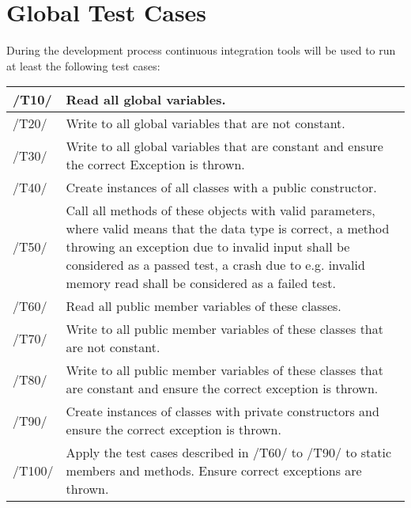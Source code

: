 \chapter{Global Test Cases}
During the development process continuous integration tools will be used to run at least the following test cases: \\

\begin{longtable}{|p{1cm} | p{15cm}|}
  \hline
  /T10/ & Read all global variables.\\
  \hline
  /T20/ & Write to all global variables that are not constant.\\
  \hline
  /T30/ & Write to all global variables that are constant and ensure the correct Exception is thrown.\\
  \hline
  /T40/ & Create instances of all classes with a public constructor.\\
  \hline
  /T50/ & Call all methods of these objects with valid parameters, where valid means that the data type is correct, a method throwing an exception due to invalid input shall be considered as a passed test, a crash due to e.g. invalid memory read shall be considered as a failed test.\\
  \hline
  /T60/ & Read all public member variables of these classes.\\
  \hline
  /T70/ & Write to all public member variables of these classes that are not constant.\\
  \hline
  /T80/ & Write to all public member variables of these classes that are constant and ensure the correct exception is thrown.\\
  \hline
  /T90/ & Create instances of classes with private constructors and ensure the correct exception is thrown.\\
  \hline
  /T100/ &  Apply the test cases described in /T60/ to /T90/ to static members and methods. Ensure correct exceptions are thrown.\\
   \hline
\end{longtable}

